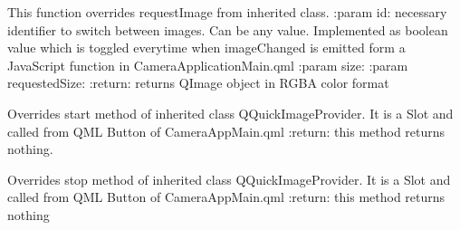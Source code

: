 \documentclass[letterpaper,10pt,english]{sphinxmanual}
\begin{document}
\begin{fulllineitems}
\label{\detokenize{modules:src.cameraApplication.cameraProcessing.VideoPlayer}}
\pysigstartsignatures
{}
\pysigstopsignatures{}

\begin{fulllineitems}
\label{\detokenize{modules:src.cameraApplication.cameraProcessing.VideoPlayer.requestImage}}
\pysigstartsignatures
{}
\pysigstopsignatures
\sphinxAtStartPar
This function overrides requestImage from inherited class.
:param id: necessary identifier to switch between images. Can be any value. Implemented as boolean value which is toggled
everytime when imageChanged is emitted form a JavaScript \sphinxhyphen{} function in CameraApplicationMain.qml
:param size:
:param requestedSize:
:return: returns QImage object in RGBA color format

\end{fulllineitems}


\begin{fulllineitems}
\label{\detokenize{modules:src.cameraApplication.cameraProcessing.VideoPlayer.start}}
\pysigstartsignatures
{}
\pysigstopsignatures
\sphinxAtStartPar
Overrides start method of inherited class QQuickImageProvider. It is a Slot and called from QML Button of CameraAppMain.qml
:return: this method returns nothing.

\end{fulllineitems}


\begin{fulllineitems}
\label{\detokenize{modules:src.cameraApplication.cameraProcessing.VideoPlayer.stop}}
\pysigstartsignatures
{}
\pysigstopsignatures
\sphinxAtStartPar
Overrides stop method of inherited class QQuickImageProvider. It is a Slot and called from QML Button of CameraAppMain.qml
:return: this method returns nothing


\end{fulllineitems}
\end{fulllineitems}
\end{document}
